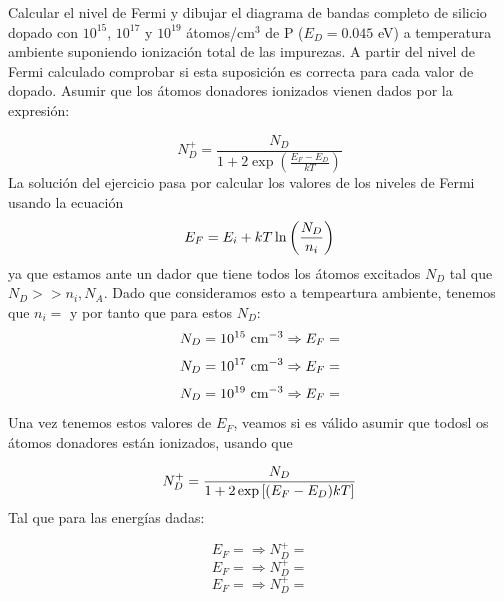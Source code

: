 \begin{texercise}
	Calcular el nivel de Fermi y dibujar el diagrama de bandas completo de silicio dopado con $10^{15}$, $10^{17}$ y $10^{19}$ átomos/cm$^3$ de P ($E_D = 0.045$ eV) a temperatura ambiente suponiendo ionización total de las impurezas. A partir del nivel de Fermi calculado comprobar si esta suposición es correcta para cada valor de dopado. Asumir que los átomos donadores ionizados vienen dados por la expresión:

	\begin{equation}
		N_D^+ = \frac{N_D}{1 + 2 \exp \left( \frac{E_F - E_D}{kT} \right)}
	\end{equation}
	\tcblower
	La solución del ejercicio pasa por calcular los valores de los niveles de Fermi usando la ecuación
	\begin{equation}
		E_F = E_i + kT \ln \left( \frac{N_D}{n_i} \right)
	\end{equation}
	ya que estamos ante un dador que tiene todos los átomos excitados $N_D$ tal que $N_D>>n_i,N_A$. Dado que consideramos esto a tempeartura ambiente, tenemos que $n_i=$ y por tanto que para estos $N_D$:
	\begin{equation}
		N_D=10^{15} \ \text{cm}^{-3} \Rightarrow E_F = 
	\end{equation}
	\begin{equation}
		N_D=10^{17} \ \text{cm}^{-3} \Rightarrow E_F = 
	\end{equation}
	\begin{equation}
		N_D=10^{19} \ \cm^{-3} \Rightarrow E_F = 
	\end{equation}
	Una vez tenemos estos valores de $E_F$, veamos si es válido asumir que todosl os átomos donadores están ionizados, usando que 

	\begin{equation}
		N_D^+ = \frac{N_D}{1+2\exp\left[ (E_F-E_D)kT \right]}
	\end{equation}
	Tal que para las energías dadas:

	\begin{equation}
		E_F=  \Rightarrow N_D^+ = 
	\end{equation}
	\begin{equation}
		E_F = \Rightarrow N_D^+ = 
	\end{equation}
	\begin{equation}
		E_F = \Rightarrow N_D^+ = 
	\end{equation}
\end{texercise}


